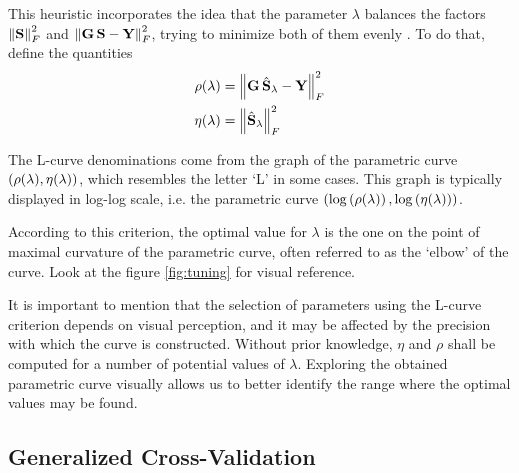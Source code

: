 This heuristic incorporates the idea that the parameter $\lambda$ balances the factors $\left\lVert \mathbf{S} \right\rVert_F^2$ and $\left\lVert \mathbf{G}\, \mathbf{S} - \mathbf{Y} \right\rVert_F^2$, trying to minimize both of them evenly \cite{Lcurve}.
%
To do that, define the quantities
\begin{align}
\rho(\lambda)
&=
\left\lVert \mathbf{G}\, \hat{\mathbf{S}}_\lambda - \mathbf{Y} \right\rVert_F^2
\\
\eta(\lambda)
&=
\left\lVert \hat{\mathbf{S}}_\lambda \right\rVert_F^2 
\label{det:Lcurve}
\end{align}

The L-curve denominations come from the graph of the parametric curve $\left( \rho(\lambda), \eta(\lambda)  \right)$, which resembles the letter `L' in some cases.
%
This graph is typically displayed in log-log scale, i.e. the parametric curve $\left( \log\left( \rho(\lambda) \right), \log\left( \eta(\lambda) \right)  \right)$.
%

According to this criterion, the optimal value for $\lambda$ is the one on the point of maximal curvature of the parametric curve, often referred to as the `elbow' of the curve.
%
Look at the figure \ref{fig:tuning} for visual reference.

It is important to mention that the selection of parameters using the L-curve criterion depends on visual perception, and it may be affected by the precision with which the curve is constructed.
%
Without prior knowledge, $\eta$ and $\rho$ shall be computed for a number of potential values of $\lambda$.
%
Exploring the obtained parametric curve visually allows us to better identify the range where the optimal values may be found.




\subsection{Generalized Cross-Validation}

